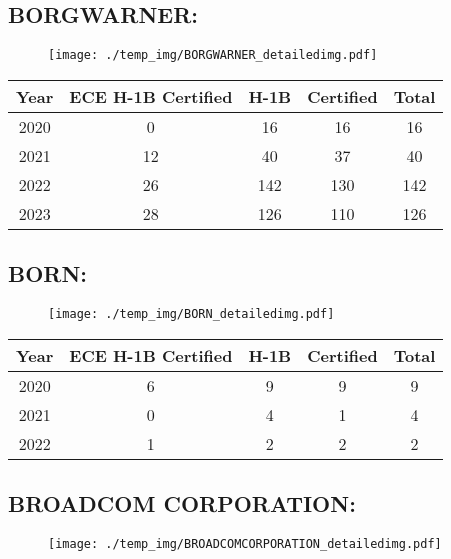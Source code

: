 \documentclass{article}%
\begin{document}
%
\newpage%
\subsection{BORGWARNER:}%
\label{subsec:BORGWARNER}%
\label{BORGWARNERdetailed}%


\begin{figure}[htbp]%
\centering%
\texttt{[image: ./temp\_img/BORGWARNER\_detailedimg.pdf]}%
\end{figure}

%
\begin{longtable}{c|c|c|c|c}%
\hline%
Year&ECE H{-}1B Certified&H{-}1B&Certified&Total\\%
\hline%
2020&0&16&16&16\\%
\hline%
2021&12&40&37&40\\%
\hline%
2022&26&142&130&142\\%
\hline%
2023&28&126&110&126\\%
\hline%
\end{longtable}

%
\newpage%
\subsection{BORN:}%
\label{subsec:BORN}%
\label{BORNdetailed}%


\begin{figure}[htbp]%
\centering%
\texttt{[image: ./temp\_img/BORN\_detailedimg.pdf]}%
\end{figure}

%
\begin{longtable}{c|c|c|c|c}%
\hline%
Year&ECE H{-}1B Certified&H{-}1B&Certified&Total\\%
\hline%
2020&6&9&9&9\\%
\hline%
2021&0&4&1&4\\%
\hline%
2022&1&2&2&2\\%
\hline%
\end{longtable}

%
\newpage%
\subsection{BROADCOM CORPORATION:}%
\label{subsec:BROADCOMCORPORATION}%
\label{BROADCOMCORPORATIONdetailed}%


\begin{figure}[htbp]%
\centering%
\texttt{[image: ./temp\_img/BROADCOMCORPORATION\_detailedimg.pdf]}%
\end{figure}
\end{document}
